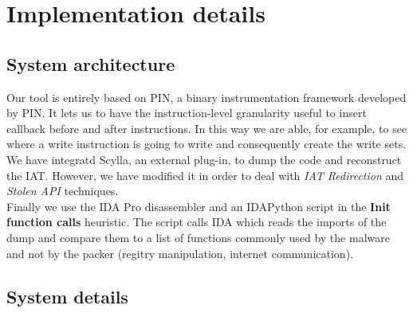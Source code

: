 \chapter{Implementation details}
\label{chapter4}
\thispagestyle{empty}

\section{System architecture}
Our tool is entirely based on PIN, a binary instrumentation framework developed by PIN. It lets us to have the instruction-level granularity useful to insert callback before and after instructions. In this way we are able, for example, to see where a write instruction is going to write and consequently create the write sets.\\
We have integratd Scylla, an external plug-in, to dump the code and reconstruct the IAT. However, we have modified it in order to deal with \textit{IAT Redirection} and \textit{Stolen API} techniques.\\
Finally we use the IDA Pro disassembler and an IDAPython script in the \textbf{Init function calls} heuristic. The script calls IDA which reads the imports of the dump and compare them to a list of functions commonly used by the malware and not by the packer (regitry manipulation, internet communication).

\section{System details}